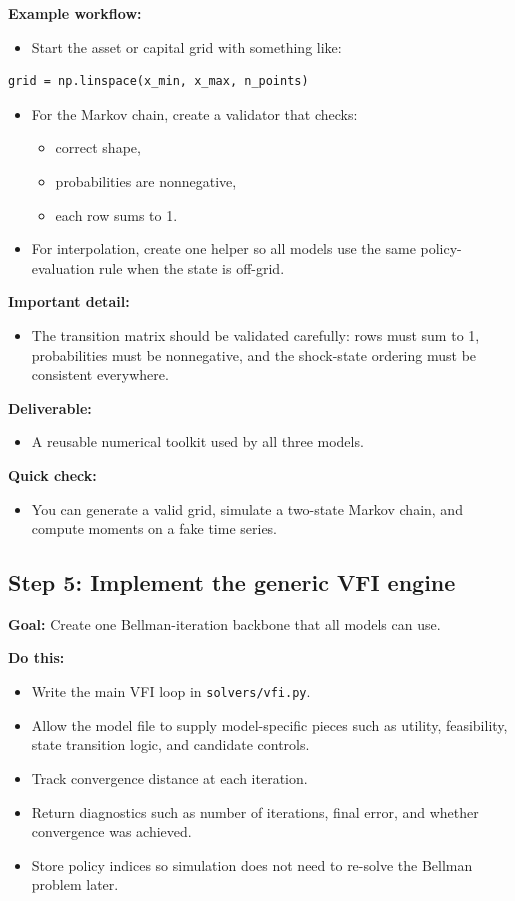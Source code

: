 \documentclass[11pt]{article}
\begin{document}
\textbf{Example workflow:}
\begin{itemize}
    \item Start the asset or capital grid with something like:
\end{itemize}
\begin{lstlisting}
grid = np.linspace(x_min, x_max, n_points)
\end{lstlisting}
\begin{itemize}
    \item For the Markov chain, create a validator that checks:
    \begin{itemize}
        \item correct shape,
        \item probabilities are nonnegative,
        \item each row sums to 1.
    \end{itemize}
    \item For interpolation, create one helper so all models use the same policy-evaluation rule when the state is off-grid.
\end{itemize}

\textbf{Important detail:}
\begin{itemize}
    \item The transition matrix should be validated carefully: rows must sum to 1, probabilities must be nonnegative, and the shock-state ordering must be consistent everywhere.
\end{itemize}

\textbf{Deliverable:}
\begin{itemize}
    \item A reusable numerical toolkit used by all three models.
\end{itemize}

\textbf{Quick check:}
\begin{itemize}
    \item You can generate a valid grid, simulate a two-state Markov chain, and compute moments on a fake time series.
\end{itemize}

\subsection{Step 5: Implement the generic VFI engine}
\textbf{Goal:} Create one Bellman-iteration backbone that all models can use.

\textbf{Do this:}
\begin{itemize}
    \item Write the main VFI loop in \verb|solvers/vfi.py|.
    \item Allow the model file to supply model-specific pieces such as utility, feasibility, state transition logic, and candidate controls.
    \item Track convergence distance at each iteration.
    \item Return diagnostics such as number of iterations, final error, and whether convergence was achieved.
    \item Store policy indices so simulation does not need to re-solve the Bellman problem later.
\end{itemize}
\end{document}
